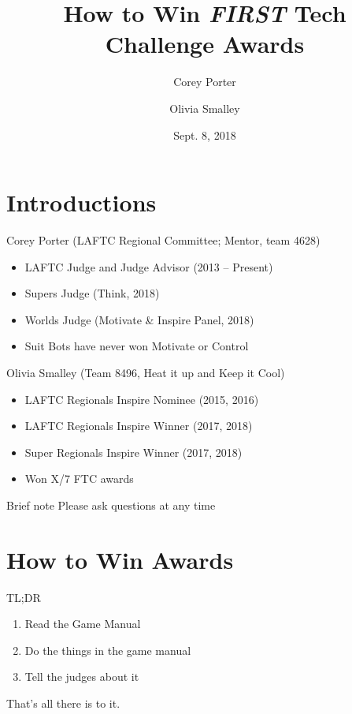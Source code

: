 \documentclass{beamer}
\title{How to Win \textit{FIRST} Tech Challenge Awards}
\date{Sept. 8, 2018}
\author{
  Corey Porter\\
  \and
  Olivia Smalley\\
}
\institute{\textit{FIRST} Tech Challenge Southern California}
\begin{document}
  \maketitle
  \section{Introductions}
  \begin{frame}{Corey Porter (LAFTC Regional Committee; Mentor, team 4628)}
    \begin{itemize}
    \item LAFTC Judge and Judge Advisor (2013 -- Present)
    \item Supers Judge (Think, 2018)
    \item Worlds Judge (Motivate \& Inspire Panel, 2018)
    \item Suit Bots have never won Motivate or Control
    \end{itemize}
  \end{frame}
  \begin{frame}{Olivia Smalley (Team 8496, Heat it up and Keep it Cool)}
    \begin{itemize}
    \item LAFTC Regionals Inspire Nominee (2015, 2016)
    \item LAFTC Regionals Inspire Winner (2017, 2018)
    \item Super Regionals Inspire Winner (2017, 2018)
    \item Won X/7 FTC awards
    \end{itemize}
  \end{frame}

  \begin{frame}{Brief note}
    \huge{Please ask questions at any time}
  \end{frame}

  \section{How to Win Awards}

  \begin{frame}{TL;DR}
    \begin{enumerate}
    \item{Read the Game Manual} \pause
    \item{Do the things in the game manual} \pause
    \item{Tell the judges about it} \pause
    \end{enumerate}
    \par
    That's all there is to it.
  \end{frame}
\end{document}
